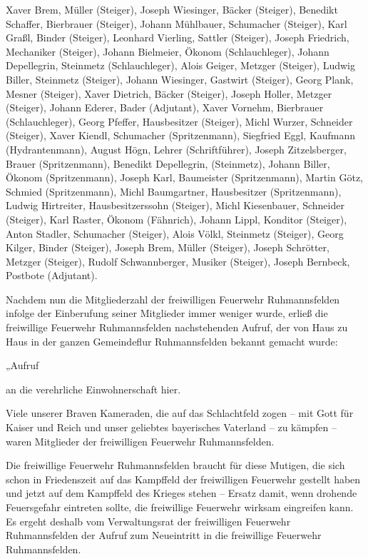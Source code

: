 \documentclass[12pt,a4paper]{book}
\begin{document}
Xaver Brem, Müller (Steiger), Joseph Wiesinger, Bäcker (Steiger), Benedikt
Schaffer, Bierbrauer (Steiger), Johann Mühlbauer, Schumacher (Steiger), Karl
Graßl, Binder (Steiger), Leonhard Vierling, Sattler (Steiger), Joseph Friedrich,
Mechaniker (Steiger), Johann Bielmeier, Ökonom (Schlauchleger), Johann
Depellegrin, Steinmetz (Schlauchleger), Alois Geiger, Metzger (Steiger), Ludwig
Biller, Steinmetz (Steiger), Johann Wiesinger, Gastwirt (Steiger), Georg Plank,
Mesner (Steiger), Xaver Dietrich, Bäcker (Steiger), Joseph Holler, Metzger
(Steiger), Johann Ederer, Bader (Adjutant), Xaver Vornehm, Bierbrauer
(Schlauchleger), Georg Pfeffer, Hausbesitzer (Steiger), Michl Wurzer, Schneider
(Steiger), Xaver Kiendl, Schumacher (Spritzenmann), Siegfried Eggl, Kaufmann
(Hydrantenmann), August Högn, Lehrer (Schriftführer), Joseph Zitzelsberger,
Brauer (Spritzenmann), Benedikt Depellegrin, (Steinmetz), Johann Biller, Ökonom
(Spritzenmann), Joseph Karl, Baumeister (Spritzenmann), Martin Götz, Schmied
(Spritzenmann), Michl Baumgartner, Hausbesitzer (Spritzenmann), Ludwig
Hirtreiter, Hausbesitzerssohn (Steiger), Michl Kiesenbauer, Schneider (Steiger),
Karl Raster, Ökonom (Fähnrich), Johann Lippl, Konditor (Steiger), Anton Stadler,
Schumacher (Steiger), Alois Völkl, Steinmetz (Steiger), Georg Kilger, Binder
(Steiger), Joseph Brem, Müller (Steiger), Joseph Schrötter, Metzger (Steiger),
Rudolf Schwannberger, Musiker (Steiger), Joseph Bernbeck, Postbote (Adjutant).

Nachdem nun die Mitgliederzahl der freiwilligen Feuerwehr Ruhmannsfelden infolge
der Einberufung seiner Mitglieder immer weniger wurde, erließ die freiwillige
Feuerwehr Ruhmannsfelden nachstehenden Aufruf, der von Haus zu Haus in der
ganzen Gemeindeflur Ruhmannsfelden bekannt gemacht wurde:

„Aufruf

an die verehrliche Einwohnerschaft hier.

Viele unserer Braven Kameraden, die auf das Schlachtfeld zogen – mit Gott für
Kaiser und Reich und unser geliebtes bayerisches Vaterland – zu kämpfen – waren
Mitglieder der freiwilligen Feuerwehr Ruhmannsfelden.

Die freiwillige Feuerwehr Ruhmannsfelden braucht für diese Mutigen, die sich
schon in Friedenszeit auf das Kampffeld der freiwilligen Feuerwehr gestellt
haben und jetzt auf dem Kampffeld des Krieges stehen – Ersatz damit, wenn
drohende Feuersgefahr eintreten sollte, die freiwillige Feuerwehr wirksam
eingreifen kann. Es ergeht deshalb vom Verwaltungsrat der freiwilligen Feuerwehr
Ruhmannsfelden der Aufruf zum Neueintritt in die freiwillige Feuerwehr
Ruhmannsfelden.
\end{document}
